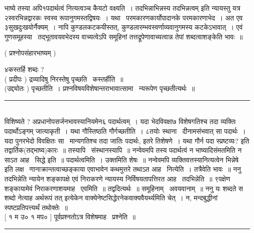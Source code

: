 \documentclass[11pt, openany]{book}
\begin{document}
\begin{multicols}{2}
\noindent
भाष्ये तस्या अपि१पदार्थत्वं नित्यत्वञ्च कैयटो वक्ष्यति~।  {\qt तदभिन्नाभिन्नस्य तदभिन्नत्वम्} इति न्यायस्तु यत्र २स्वरभिन्नद्वारकः स्वस्व रूपानुगमस्तद्विषयः~। यथा \textendash\ परमकारणकार्योपादानके परमकारणाभेद~।  अत एव ३सुखदुःखयोर्नैक्यम्~। नापि कुण्डलकटकयीस्तत्, कुण्डलारम्भवस्वर्णाव्यवानुगमस्य कटकेऽभावात्~। एवं गुणसमूहस्या \textendash\  तद्भूतावयवभेदस्य वाच्यत्वेऽपि समूहिनां तत्तद्रूपेणावाच्यत्वान्न तेपां शब्दत्वाशङ्केति भावः~॥

\begin{center}
( प्रश्नोपसंहारभाष्यम् )
\end{center}

{\qt ४कस्तर्हि शब्दः ?}\\

( प्रदीपः ) द्रव्यादिषु निरस्तेषु पृच्छति \textendash\ कस्तर्हीति~॥ \\

(उद्द्योतः ) पृच्छतीति~। प्रश्नविषयविशेषान्तराभावात्सामा \textendash\ न्यरूपेण पृच्छतीत्यर्थः~॥

\noindent
\rule{1\linewidth}{0.5pt}\\

\noindent
विशिष्यते ? अप्रधानोपसर्जनभावस्यानियमेन६ पदार्थत्वम्~। यदा भेदविवक्षा७ विशेषगतिश्च तदा व्यक्तिः पदार्थोऽङ्गम् जात्याकृती~। यथा गौस्तिष्ठति गौर्गच्छतीति~। ८तयोः स्थाना \textendash\ दीनामसंभवात् सा पदार्थः~। यदा पुनरभेदो विवक्षितः सा \textendash\ मान्यगतिश्च तदा जातिः पदार्थः, इतरे तिशेषणे~। यथा {\qt गौर्न पदा स्प्रष्टव्यः}? इति तद्वार्तिक(तद्भाष्य)कारः~॥ तस्यापि \textendash\  संस्थानस्यापि~॥ नन्वेवमपि तस्य पदार्थत्वं न भाष्यादिसंमतमिति न साऽत आह \textendash\ सिद्धे इति~॥ पदार्थत्वमिति~। उक्तमिति शेषः~॥ नन्वेवमपि व्यक्तिवत्तस्यानित्यत्वेन {\qt भिन्नेषे \textendash\ } इति लक्ष \textendash\ णानाक्रान्तत्वाच्छङ्काया एवाभावेन कथमुत्तरे तथाऽत आह \textendash\ नित्येति~। तत्रैवेति भावः~॥ ननु तदभिन्नेति न्यायेन शङ्कापक्षे एवं निराकरणे न्यायस्य निर्विषयतापत्तिरत आह \textendash\ तदभिन्नेति~॥ ९पक्षेण शङ्कायामेवं निराकरणाशयमाह \textendash\ एवमिति~॥ तद्वदित्यर्थः~॥ समूहिनाम् \textendash\ अवयवानाम्~॥ ननु यः शब्दते स शब्दो नेत्याह अर्थरूपं तत् इत्येकेन वाक्येनेष्टसिद्धेरनेकवाक्यवैयर्थ्यमिति चेत्~। न, मन्दबुद्धीनां स्पष्टप्रतिपत्त्यर्थं तथोक्तेः~॥\\

[ १ म उ० १ मप० ] पूर्वप्रश्नतोऽत्र विशेषमाह \textendash\ प्रश्नेति~॥

\noindent
\rule{1\linewidth}{0.5pt}\\


\end{multicols}
\end{document}
